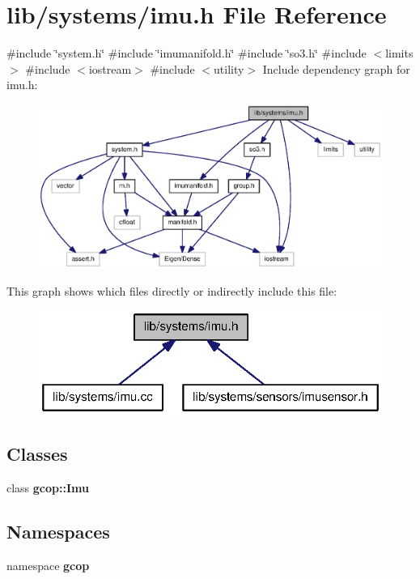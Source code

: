 \section{lib/systems/imu.h \-File \-Reference}
\label{imu_8h}
{\ttfamily \#include \char`\"{}system.\-h\char`\"{}}\*
{\ttfamily \#include \char`\"{}imumanifold.\-h\char`\"{}}\*
{\ttfamily \#include \char`\"{}so3.\-h\char`\"{}}\*
{\ttfamily \#include $<$limits$>$}\*
{\ttfamily \#include $<$iostream$>$}\*
{\ttfamily \#include $<$utility$>$}\*
\-Include dependency graph for imu.\-h\-:
\nopagebreak
\begin{figure}[H]
\begin{center}
\leavevmode
\includegraphics[width=350pt]{imu_8h__incl}
\end{center}
\end{figure}
\-This graph shows which files directly or indirectly include this file\-:
\nopagebreak
\begin{figure}[H]
\begin{center}
\leavevmode
\includegraphics[width=320pt]{imu_8h__dep__incl}
\end{center}
\end{figure}
\subsection*{\-Classes}
\begin{DoxyCompactItemize}
\item 
class {\bf gcop\-::\-Imu}
\end{DoxyCompactItemize}
\subsection*{\-Namespaces}
\begin{DoxyCompactItemize}
\item 
namespace {\bf gcop}
\end{DoxyCompactItemize}

